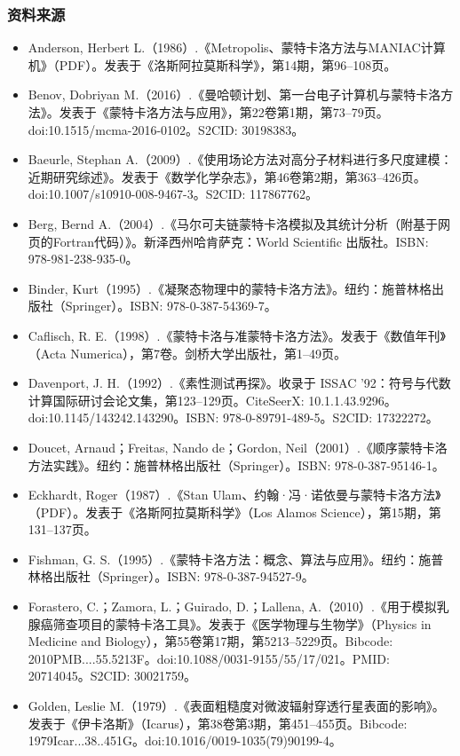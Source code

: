 \subsubsection{资料来源}
\begin{itemize}
\item Anderson, Herbert L.（1986）.《Metropolis、蒙特卡洛方法与MANIAC计算机》（PDF）。发表于《洛斯阿拉莫斯科学》，第14期，第96–108页。
\item Benov, Dobriyan M.（2016）.《曼哈顿计划、第一台电子计算机与蒙特卡洛方法》。发表于《蒙特卡洛方法与应用》，第22卷第1期，第73–79页。doi:10.1515/mcma-2016-0102。S2CID: 30198383。
\item Baeurle, Stephan A.（2009）.《使用场论方法对高分子材料进行多尺度建模：近期研究综述》。发表于《数学化学杂志》，第46卷第2期，第363–426页。doi:10.1007/s10910-008-9467-3。S2CID: 117867762。
\item Berg, Bernd A.（2004）.《马尔可夫链蒙特卡洛模拟及其统计分析（附基于网页的Fortran代码）》。新泽西州哈肯萨克：World Scientific 出版社。ISBN: 978-981-238-935-0。
\item Binder, Kurt（1995）.《凝聚态物理中的蒙特卡洛方法》。纽约：施普林格出版社（Springer）。ISBN: 978-0-387-54369-7。
\item Caflisch, R. E.（1998）.《蒙特卡洛与准蒙特卡洛方法》。发表于《数值年刊》（Acta Numerica），第7卷。剑桥大学出版社，第1–49页。
\item Davenport, J. H.（1992）.《素性测试再探》。收录于 ISSAC '92：符号与代数计算国际研讨会论文集，第123–129页。CiteSeerX: 10.1.1.43.9296。doi:10.1145/143242.143290。ISBN: 978-0-89791-489-5。S2CID: 17322272。
\item Doucet, Arnaud；Freitas, Nando de；Gordon, Neil（2001）.《顺序蒙特卡洛方法实践》。纽约：施普林格出版社（Springer）。ISBN: 978-0-387-95146-1。
\item Eckhardt, Roger（1987）.《Stan Ulam、约翰·冯·诺依曼与蒙特卡洛方法》（PDF）。发表于《洛斯阿拉莫斯科学》（Los Alamos Science），第15期，第131–137页。
\item Fishman, G. S.（1995）.《蒙特卡洛方法：概念、算法与应用》。纽约：施普林格出版社（Springer）。ISBN: 978-0-387-94527-9。
\item Forastero, C.；Zamora, L.；Guirado, D.；Lallena, A.（2010）.《用于模拟乳腺癌筛查项目的蒙特卡洛工具》。发表于《医学物理与生物学》（Physics in Medicine and Biology），第55卷第17期，第5213–5229页。Bibcode: 2010PMB....55.5213F。doi:10.1088/0031-9155/55/17/021。PMID: 20714045。S2CID: 30021759。
\item Golden, Leslie M.（1979）.《表面粗糙度对微波辐射穿透行星表面的影响》。发表于《伊卡洛斯》（Icarus），第38卷第3期，第451–455页。Bibcode: 1979Icar...38..451G。doi:10.1016/0019-1035(79)90199-4。

\end{itemize}
